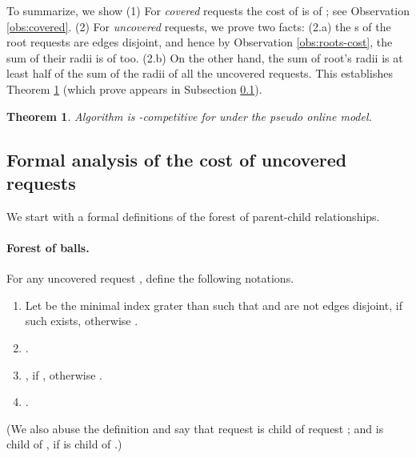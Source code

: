\documentclass[11pt]{article}
\newtheorem{theorem}{Theorem}[section]
\def\blackslug{\hbox{\hskip 1pt \vrule width 4pt height 8pt
    depth 1.5pt \hskip 1pt}}
\def\QED{\quad\blackslug\lower 8.5pt\null\par}
\begin{document}
To summarize, we show
(1) For {\em covered} requests the cost of  is  of ; see Observation \ref{obs:covered}.
(2) For {\em uncovered} requests, we prove
two facts:
(2.a) the s of the root requests are edges disjoint, and hence by
Observation \ref{obs:roots-cost}, the sum of their radii is  of  too.
(2.b) On the other hand, the sum of root's radii is at least half of the sum of the radii of all the uncovered requests.
This establishes Theorem \ref{thm: square is O(1)-approx} (which prove appears in Subsection \ref{subsec: Formal Ana Square}).


\begin{theorem}
Algorithm  is -competitive for
 under the pseudo online model.
\label{thm: square is O(1)-approx}
\end{theorem}
\def\AppSquareThm{
The ratio for covered request follows Inequality (\ref{ineq:sqr: opt geq sum cover radii}).
For uncovered requests it follows from
Observation \ref{obs:roots-distjoint} and Observation \ref{obser:sqr:opt geq sum rho_i} that

Combining this with Lemma
\ref{lema:sqr:root radi geq sum of its children}, we have,

Thus, also,

The Theorem follows from Observation
\ref{obser:sqr: cost Square > 14 sum radii}.
\QED
} 











\subsection{Formal analysis of the cost of uncovered requests}
\label{subsec: Formal Ana Square}

We start with a formal definitions of the forest of parent-child relationships.
\paragraph*{Forest of balls.}


For any uncovered request , define the following notations.
\begin{enumerate}

\item Let  be the minimal index grater than  such that   and  are not edges disjoint, if such exists, otherwise .

\item .

\item , if , otherwise .

\item .

\end{enumerate}
(We also abuse the definition and say that request  is child of request ; and  is child of , if  is child of .)
\end{document}
